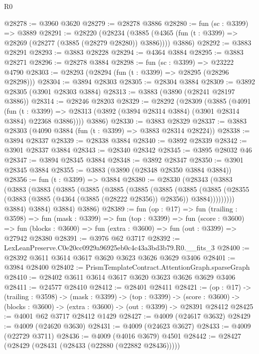 \begin{lexlean}{R0}
\begin{coremodule}
@28278 := @3960 @3620
@28279 := @28278 @3886
@28280 := fun (sc : @3399) => @3889
@28291 := @28220
    (@28234
      (@3885 (@4365 (fun (t : @3399) => @28269 (@28277 (@3885 (@28279 @28280)) @3886))))
      @3886)
@28292 := @3883 @28291
@28293 := @3883 @28228
@28294 := @4364 @3884
@28295 := @3883 @28271
@28296 := @28278 @3884
@28298 := fun (sc : @3399) => @23222 @4790
@28303 := @28293 (@28294 (fun (t : @3399) => @28295 (@28296 @28298)))
@28304 := @3894 @28303
@28305 := @28304 @3884
@28309 := @3892 @28305 (@3901 @28303 @3884)
@28313 := @3883 (@3890 (@28241 @28197 @3886))
@28314 := @28246 @28203
@28329 := @28292
    (@28309
      (@3885
        (@4091
          (fun (t : @3399) =>
          @28313 (@3892 (@3894 @28314 @3884) (@3901 @28314 @3884) @22368 @3886))))
      @3886)
@28330 := @3883 @28329
@28337 := @3883 @28303 (@4090 @3884 (fun (t : @3399) => @3883 @28314 @28224))
@28338 := @3894 @28337
@28339 := @28338 @3884
@28340 := @3892 @28339
@28342 := @3901 @28337 @3884
@28343 := @28340 @28342
@28345 := @3895 @28032 @46
@28347 := @3894 @28345 @3884
@28348 := @3892 @28347
@28350 := @3901 @28345 @3884
@28355 := @3883 (@3890 (@28348 @28350 @3884 @3884))
@28356 := fun (t : @3399) => @3884
@28380 := @28330
    (@28343
      (@3883
        (@3883
          (@3883
            (@3885
              (@3885
                (@3885
                  (@3885
                    (@3885
                      (@3885
                        (@3885
                          (@28355
                            (@3883 (@3885 (@4364 (@3885 (@28222 @28356)) @28356)) @3884)))))))))
            @3884)
          @3884)
        @3884)
      @3886)
@28389 := fun (op : @17) =>
  fun (trailing : @3598) =>
  fun (mask : @3399) =>
  fun (top : @3399) =>
  fun (score : @3600) =>
  fun (blocks : @3600) => fun (extra : @3600) => fun (out : @3399) => @27942 @28380
@28391 := @3976 @62 @3717
@28392 := LexLeanPreserve.C0e20cc0929a96925eb0c4c43a3bd3b79.R0.__fits_3
@28400 := @28392 @3611 @3614 @3617 @3620 @3623 @3626 @3629 @3406
@28401 := @3984 @28400
@28402 := PrismTemplateContract.AttentionGraph.sparseGraph
@28410 := @28402 @3611 @3614 @3617 @3620 @3623 @3626 @3629 @3406
@28411 := @24577 @28410
@28412 := @28401 @28411
@28421 := (op : @17) ->
  (trailing : @3598) ->
  (mask : @3399) ->
  (top : @3399) ->
  (score : @3600) -> (blocks : @3600) -> (extra : @3600) -> (out : @3399) -> @28391 @28412
@28425 := @4001 @62 @3717 @28412 @1429
@28427 := @4009 (@24617 @3632)
@28429 := @4009 (@24620 @3630)
@28431 := @4009 (@24623 @3627)
@28433 := @4009 (@22729 @3711)
@28436 := @4009 (@4016 @3679) @4501
@28442 := @28427 (@28429 (@28431 (@28433 (@22880 (@22882 @28436)))))

\end{coremodule}
\end{lexlean}
